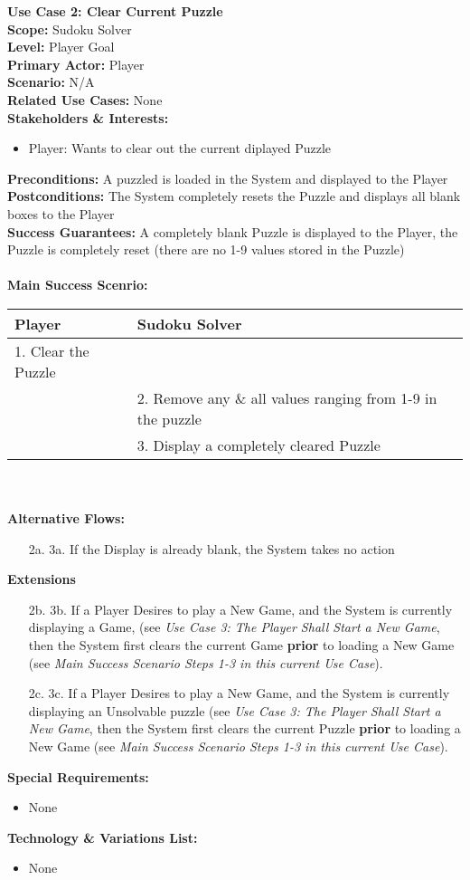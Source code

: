 \documentclass[letterpaper]{article}
\begin{document}
\noindent
\textbf{Use Case 2:  Clear Current Puzzle}\\
\textbf{Scope:  }Sudoku Solver\\
\textbf{Level:  }Player Goal\\
\textbf{Primary Actor:  }Player\\
\textbf{Scenario:  }N/A\\
\textbf{Related Use Cases:  }None\\
\textbf{Stakeholders \& Interests:}
\begin{itemize}
\item Player:  Wants to clear out the current diplayed Puzzle
\end{itemize}
\textbf{Preconditions:  }A puzzled is loaded in the System and
displayed to the Player\\
\textbf{Postconditions:  }The System completely resets the Puzzle and
displays all blank boxes to the Player\\
\textbf{Success Guarantees:  }A completely blank Puzzle is displayed
to the Player, the Puzzle is completely reset (there are no 1-9 values
stored in the Puzzle)\\\\
\textbf{Main Success Scenrio:  }\\
\begin{tabular}{|p{5.75cm}|p{5.75cm}|}\hline
\textbf{Player} & \textbf{Sudoku Solver}\\\hline
1.  Clear the Puzzle &\\\hline
& 2.  Remove any \& all values ranging from 1-9 in the puzzle\\\hline
& 3.  Display a completely cleared Puzzle\\\hline 
\end{tabular}\\\\
\textbf{Alternative Flows:}
\begin{itemize}
\item[2a. 3a. ]If the Display is already blank, the System takes no
action
\end{itemize}
\textbf{Extensions}
\begin{itemize}
\item[2b. 3b. ]If a Player Desires to play a New Game, and the System
is currently displaying a Game, (see \textit{Use Case 3:  The Player
Shall Start a New Game}, then the System first clears the current
Game \textbf{prior} to loading a New Game (see \textit{Main Success
Scenario Steps 1-3 in this current Use Case}).
\item[2c. 3c. ]If a Player Desires to play a New Game, and the System
is currently displaying an Unsolvable puzzle (see \textit{Use Case 3:  
The Player Shall Start a New Game},  then the System first clears the
current Puzzle \textbf{prior} to loading a New Game (see 
\textit{Main Success Scenario Steps 1-3 in this current Use Case}).
\end{itemize}
\textbf{Special Requirements:}
\begin{itemize}
\item None
\end{itemize}
\textbf{Technology \& Variations List:}
\begin{itemize}
\item None
\end{itemize}
\end{document}
